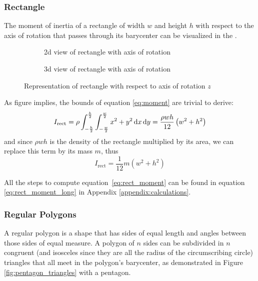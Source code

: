 \subsubsection{Rectangle}
The moment of inertia of a rectangle of width $w$ and height $h$ with respect to
the axis of rotation that passes through its barycenter can be visualized in the
.

\begin{figure}[H]
	\centering
	\hfill
	\begin{subfigure}[]{.4\textwidth}
		\centering
		\caption{2d view of rectangle with axis of rotation}
		\label{fig:rectangle_inertia2d}
	\end{subfigure}
	\hfill
	\begin{subfigure}[]{.4\textwidth}
		\centering
		\caption{3d view of rectangle with axis of rotation}
		\label{fig:rectangle_inertia3d}
	\end{subfigure}
	\hfill\null
	\caption{Representation of rectangle with respect to axis of rotation $z$}
	\label{fig:rectangle_inertia}
\end{figure}

As figure  implies, the bounds of equation
\ref{eq:moment} are trivial to derive:
\begin{equation}
	\label{eq:rect_moment}
	I_{\text{rect}} = \rho \int_{-\frac{h}{2}}^{\frac{h}{2}}
	\int_{-\frac{w}{2}}^{\frac{w}{2}}  x^2 + y^2 \mathop{}\!\mathrm{d} x \mathop{}\!\mathrm{d} y
	= \frac{\rho wh}{12} \left( w^2 + h^2 \right)
\end{equation}
and since $\rho w h$ is the density of the rectangle multiplied by its area, we
can replace this term by its mass $m$, thus
\begin{equation}
	I_{\text{rect}} = \frac{1}{12} m\left(w^2 + h^2\right)
\end{equation}

All the steps to compute equation~\ref{eq:rect_moment} can be found in equation
\ref{eq:rect_moment_long} in Appendix \ref{appendix:calculations}.

\subsubsection{Regular Polygons}
A regular polygon is a shape that has sides of equal length and angles between
those sides of equal measure. A polygon of $n$ sides can be subdivided in $n$
congruent (and isosceles since they are all the radius of the circumscribing
circle) triangles that all meet in the polygon's barycenter,
as demonstrated in Figure \ref{fig:pentagon_triangles} with a pentagon.

